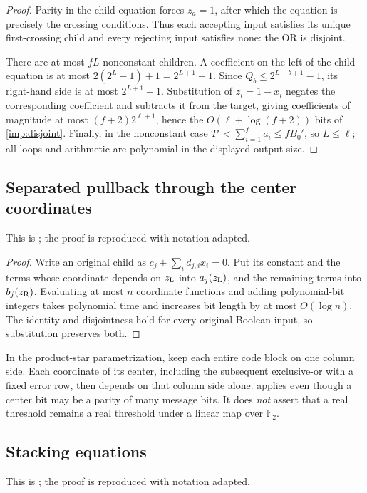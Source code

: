 \begin{proof}
Parity in the child equation forces \(z_a=1\), after which the equation is
precisely the crossing conditions. Thus each accepting input satisfies its unique
first-crossing child and every rejecting input satisfies none: the OR is
disjoint.

There are at most \(fL\) nonconstant children. A coefficient on the left
of the child equation is at most \(2(2^L-1)+1=2^{L+1}-1\). Since
\(Q_b\le2^{L-b+1}-1\), its right-hand side is at most \(2^{L+1}+1\).
Substitution of \(z_i=1-x_i\) negates the corresponding coefficient and
subtracts it from the target, giving coefficients of magnitude at most \((f+2)2^{\ell+1}\), hence the \(O(\ell+\log(f+2))\) bits of \cref{imp:disjoint}. Finally, in the nonconstant case
\(T'<\sum_{i=1}^f a_i\le fB_0'\), so \(L\le\ell\); all loops and
arithmetic are polynomial in the displayed output size. \end{proof}

\subsection{Separated pullback through the center coordinates}
\label{earlier:imp:pullback}
This is \cite[Lemma~C.3]{Nag72}; the proof is reproduced with notation adapted.

\begin{proof}
Write an original child as $c_j+\sum_i d_{j,i}x_i=0$.  Put its constant and the terms whose coordinate depends on $z_{\rm L}$ into $a_j(z_{\rm L})$, and the remaining terms into $b_j(z_{\rm R})$.  Evaluating at most $n$ coordinate
functions and adding polynomial-bit integers takes polynomial time and
increases bit length by at most $O(\log n)$.  The identity and disjointness
hold for every original Boolean input, so substitution preserves both.

\end{proof}
In the product-star parametrization, keep each entire code block on one
column side.  Each coordinate of its center, including the subsequent
exclusive-or with a fixed error row, then depends on that column side
alone.   applies even though a center bit may be a
parity of many message bits.  It does \emph{not} assert that a real
threshold remains a real threshold under a linear map over
$\mathbb F_2$.  



\subsection{Stacking equations}
\label{earlier:imp:stack}
This is \cite[Lemma~C.6]{Nag72}; the proof is reproduced with notation adapted.

